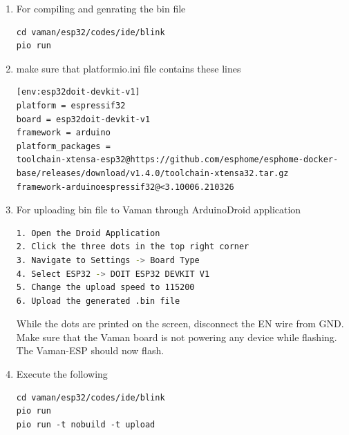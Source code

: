 \documentclass[12pt]{article}
\begin{document}
\begin{enumerate}[label=\thesection.\arabic*.,ref=\thesection.\theenumi]
\begin{figure}[!ht]
\end{figure}
			\begin{table}[!h]
		
		\caption{}
		\label{tab:vaman/uart/rpi-vaman-uart}
	\end{table}

\item For compiling and genrating the bin file 
\begin{lstlisting}
cd vaman/esp32/codes/ide/blink
pio run
\end{lstlisting}
\item make sure that platformio.ini file contains these lines
\begin{lstlisting}
[env:esp32doit-devkit-v1]
platform = espressif32
board = esp32doit-devkit-v1
framework = arduino
platform_packages =                                                               toolchain-xtensa-esp32@https://github.com/esphome/esphome-docker-base/releases/download/v1.4.0/toolchain-xtensa32.tar.gz                             
framework-arduinoespressif32@<3.10006.210326
\end{lstlisting}
\item For uploading bin file to Vaman through ArduinoDroid application 
\begin{lstlisting}[language=bash]
1. Open the Droid Application
2. Click the three dots in the top right corner
3. Navigate to Settings -> Board Type
4. Select ESP32 -> DOIT ESP32 DEVKIT V1
5. Change the upload speed to 115200
6. Upload the generated .bin file
\end{lstlisting}
While the dots are printed on the screen, disconnect the EN wire from GND.   Make sure that the Vaman board is not powering any device while flashing.  The Vaman-ESP should now flash.
\iffalse
\item Execute the following
\begin{lstlisting}
cd vaman/esp32/codes/ide/blink
pio run 
pio run -t nobuild -t upload
\end{lstlisting}

\end{enumerate}
\end{document}
